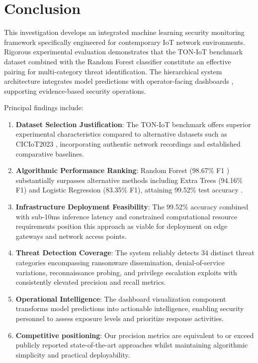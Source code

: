 \documentclass[conference]{IEEEtran}
\begin{document}
\section{Conclusion}

This investigation develops an integrated machine learning security monitoring framework specifically engineered for contemporary IoT network environments. Rigorous experimental evaluation demonstrates that the TON-IoT benchmark dataset \cite{b19} combined with the Random Forest classifier \cite{b21} constitute an effective pairing for multi-category threat identification. The hierarchical system architecture integrates model predictions with operator-facing dashboards \cite{b3}, supporting evidence-based security operations.

Principal findings include:

\begin{enumerate}
\item \textbf{Dataset Selection Justification}: The TON-IoT benchmark \cite{b19} offers superior experimental characteristics compared to alternative datasets such as CICIoT2023 \cite{b8}, incorporating authentic network recordings and established comparative baselines.

\item \textbf{Algorithmic Performance Ranking}: Random Forest (98.67\% F1 \cite{b21}) substantially surpasses alternative methods including Extra Trees (94.16\% F1) and Logistic Regression (83.35\% F1), attaining 99.52\% test accuracy \cite{b23}.

\item \textbf{Infrastructure Deployment Feasibility}: The 99.52\% accuracy combined with sub-10ms inference latency \cite{b2} and constrained computational resource requirements \cite{b14} position this approach as viable for deployment on edge gateways and network access points.

\item \textbf{Threat Detection Coverage}: The system reliably detects 34 distinct threat categories \cite{b19} encompassing ransomware dissemination, denial-of-service variations, reconnaissance probing, and privilege escalation exploits with consistently elevated precision and recall metrics.

\item \textbf{Operational Intelligence}: The dashboard visualization component \cite{b3} transforms model predictions into actionable intelligence, enabling security personnel to assess exposure levels and prioritize response activities.

\item \textbf{Competitive positioning}: Our precision metrics are equivalent to or exceed publicly reported state-of-the-art approaches \cite{b6, b7, b10} whilst maintaining algorithmic simplicity and practical deployability.
\end{enumerate}
\end{document}
